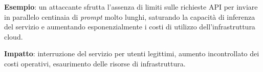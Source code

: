 \textbf{Esempio}: un attaccante sfrutta l'assenza di limiti sulle richieste API per inviare in parallelo centinaia di \emph{prompt} molto lunghi, saturando la capacità di inferenza del servizio e aumentando esponenzialmente i costi di utilizzo dell'infrastruttura cloud.

\textbf{Impatto}: interruzione del servizio per utenti legittimi, aumento incontrollato dei costi operativi, esaurimento delle risorse di infrastruttura.
